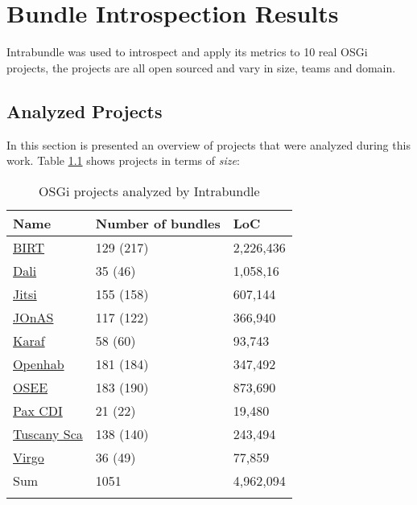 \chapter{Bundle Introspection Results}

Intrabundle was used to introspect and apply its metrics to 10 real OSGi projects, the projects are all open sourced and vary in size, teams and domain. 

\section{Analyzed Projects}
In this section is presented an overview of projects that were analyzed during this work. Table \ref{osgi-analyzed-projects} shows projects in terms of \emph{size}:

\begin{table}[h]
\caption{OSGi projects analyzed by Intrabundle}
\label{osgi-analyzed-projects}
\begin{center}      
    \begin{tabular}{  p{5cm} | p{5cm} | p{4cm}}
    \Xhline{2\arrayrulewidth}
    Name & Number of bundles & LoC \\  \hline
    \href{http://eclipse.org/birt/}{BIRT} & 129 (217) & 2,226,436\\ \hline
    \href{https://eclipse.org/webtools/dali/}{Dali} & 35 (46) & 1,058,16\\ \hline
    \href{https://jitsi.org/}{Jitsi} & 155 (158) & 607,144\\ \hline
    \href{http://jonas.ow2.org/xwiki/bin/view/Main/}{JOnAS} & 117 (122) & 366,940\\ \hline
    \href{http://karaf.apache.org/}{Karaf} & 58 (60) & 93,743\\ \hline
    \href{http://www.openhab.org/}{Openhab} & 181 (184) & 347,492\\ \hline
    \href{https://eclipse.org/osee/}{OSEE} & 183 (190) & 873,690\\ \hline
    \href{http://team.ops4j.org/wiki/display/paxcdi/}{Pax CDI} & 21 (22) & 19,480\\ \hline 
    \href{http://tuscany.apache.org/sca-overview.html}{Tuscany Sca} & 138 (140) & 243,494\\ \hline
    \href{http://www.eclipse.org/virgo/}{Virgo} & 36 (49) & 77,859\\ \hline
    Sum & 1051 & 4,962,094 \\
   \Xhline{2\arrayrulewidth}

    \end{tabular}
\end{center}
\end{table}
\FloatBarrier 

